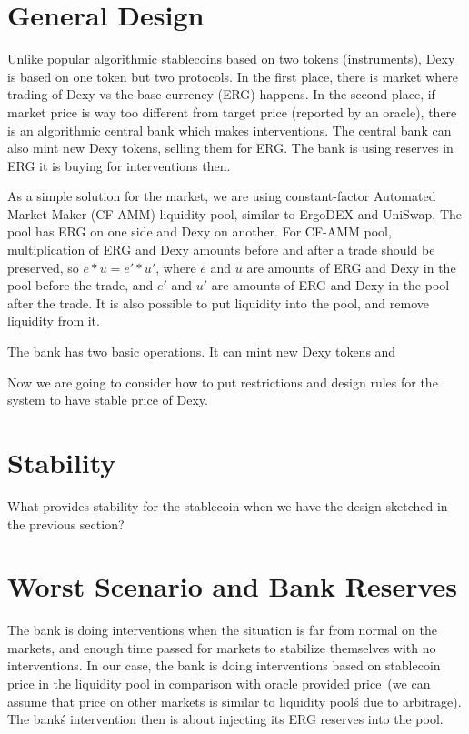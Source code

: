 \documentclass{article}   %
\newcommand{\bc}{ERG}
\newcommand{\dx}{Dexy}
\begin{document}
\section{General Design}

Unlike popular algorithmic stablecoins based on two tokens (instruments), \dx{} is based on one token but two protocols. In the first place, 
there is market where trading of \dx{} vs the base currency (\bc{}) happens. In the second place, if market price is way too different from target price (reported by an oracle), there is an algorithmic central bank which makes interventions. The central bank can also mint new \dx{} tokens, selling them for \bc{}. The bank is using reserves in \bc{} it is buying for interventions then. 

As a simple solution for the market, we are using constant-factor Automated Market Maker (CF-AMM) liquidity pool, similar to ErgoDEX and UniSwap. The pool has \bc{} on one side and \dx{} on another. For CF-AMM pool, multiplication of \bc{} and \dx{} amounts before and after a trade should be preserved, so $e * u = e' * u'$, where $e$ and $u$ are amounts of \bc{} and \dx{} in the pool before the trade, and $e'$ and $u'$ are amounts of \bc{} and \dx{} in the pool after the trade. It is also possible to put liquidity into the pool, and remove liquidity from it. 

The bank has two basic operations. It can mint new \dx{} tokens and 

Now we are going to consider how to put restrictions and design rules for the system to have stable price of \dx{}. 

\section{Stability}

What provides stability for the stablecoin when we have the design sketched in the previous section? 

\section{Worst Scenario and Bank Reserves}

The bank is doing interventions when the situation is far from normal on the markets, and enough time passed for markets to stabilize themselves with no interventions. In our case, the bank is doing interventions based on stablecoin price in the liquidity pool in comparison with oracle provided price~(we can assume that price on other markets is similar to liquidity pool\'s due to arbitrage). The bank\'s intervention then is about injecting its \bc{} reserves into the pool.  
\end{document}
